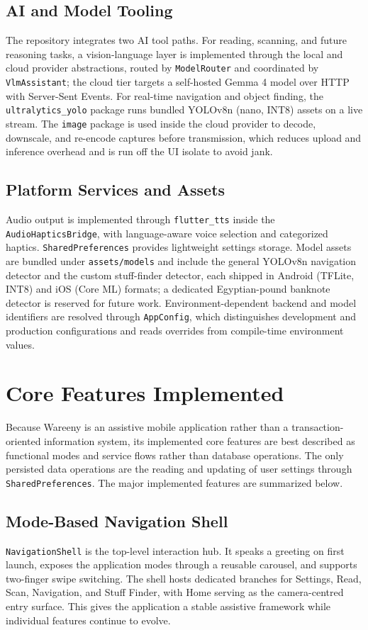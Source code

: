 \documentclass[a4paper]{report}
\begin{document}
\subsection{AI and Model Tooling}
The repository integrates two AI tool paths. For reading, scanning, and future reasoning tasks, a vision-language layer is implemented through the local and cloud provider abstractions, routed by \texttt{ModelRouter} and coordinated by \texttt{VlmAssistant}; the cloud tier targets a self-hosted Gemma 4 model over HTTP with Server-Sent Events. For real-time navigation and object finding, the \texttt{ultralytics\_yolo} package runs bundled YOLOv8n (nano, INT8) assets on a live stream. The \texttt{image} package is used inside the cloud provider to decode, downscale, and re-encode captures before transmission, which reduces upload and inference overhead and is run off the UI isolate to avoid jank.

\subsection{Platform Services and Assets}
Audio output is implemented through \texttt{flutter\_tts} inside the \texttt{AudioHapticsBridge}, with language-aware voice selection and categorized haptics. \texttt{SharedPreferences} provides lightweight settings storage. Model assets are bundled under \texttt{assets/models} and include the general YOLOv8n navigation detector and the custom stuff-finder detector, each shipped in Android (TFLite, INT8) and iOS (Core ML) formats; a dedicated Egyptian-pound banknote detector is reserved for future work. Environment-dependent backend and model identifiers are resolved through \texttt{AppConfig}, which distinguishes development and production configurations and reads overrides from compile-time environment values.

\section{Core Features Implemented}
Because Wareeny is an assistive mobile application rather than a transaction-oriented information system, its implemented core features are best described as functional modes and service flows rather than database operations. The only persisted data operations are the reading and updating of user settings through \texttt{SharedPreferences}. The major implemented features are summarized below.

\subsection{Mode-Based Navigation Shell}
\texttt{NavigationShell} is the top-level interaction hub. It speaks a greeting on first launch, exposes the application modes through a reusable carousel, and supports two-finger swipe switching. The shell hosts dedicated branches for Settings, Read, Scan, Navigation, and Stuff Finder, with Home serving as the camera-centred entry surface. This gives the application a stable assistive framework while individual features continue to evolve.
\end{document}
